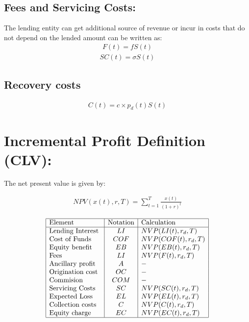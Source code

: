 \subsection{ Fees and Servicing Costs: }
The lending entity can get additional source of revenue or incur in costs that do not depend on the lended amount can be written as:
\begin{align}
F(t) = f S(t)
\end{align}
\begin{align}
SC(t) =  \sigma S(t)
\end{align}


\subsection{Recovery costs}
\begin{align}
C(t) = c\times p_d(t) S(t)
\end{align}



\section{ Incremental Profit Definition (CLV): }
The net present value is given by:

\begin{align}
NPV(x(t),r,T)=\sum_{t=1}^T \frac{x(t)}{(1+r)^t}
\end{align}

\renewcommand{\arraystretch}{1.5} %
\begin{center} %
\[ %
\begin{array}{|l|c|l|} \hline %
\mbox{Element} & \mbox{Notation} & \mbox{Calculation}\\ \hline
\mbox{Lending Interest }  & LI & NVP(LI(t),r_d,T)\\
\mbox{Cost of Funds   }  & COF & NVP(COF(t),r_d,T)\\
\mbox{Equity benefit }  & EB & NVP(EB(t),r_d,T)\\
\mbox{Fees }  & LI & NVP(F(t),r_d,T)\\
\mbox{Ancillary profit }  & A & -\\
\mbox{Origination cost}  & OC & -\\
\mbox{Commision  }  & COM & -\\
\mbox{Servicing Costs}  & SC & NVP(SC(t),r_d,T)\\
\mbox{Expected Loss }  & EL & NVP(EL(t),r_d,T)\\
\mbox{Collection costs }  & C & NVP(C(t),r_d,T)\\
\mbox{Equity charge}  & EC & NVP(EC(t),r_d,T)\\

\hline
\end{array} %
\] %
\end{center}

